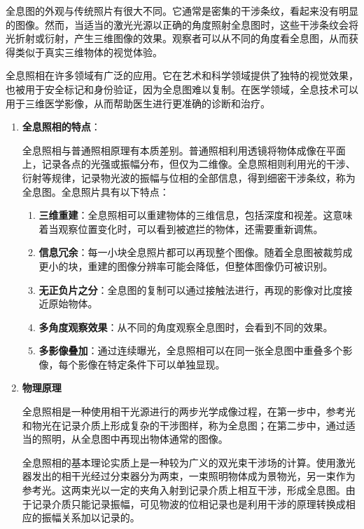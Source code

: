 \documentclass[dvipsnames, svgnames,a4paper,11pt]{article}
\begin{document}
	全息图的外观与传统照片有很大不同。它通常是密集的干涉条纹，看起来没有明显的图像。然而，当适当的激光光源以正确的角度照射全息图时，这些干涉条纹会将光折射或衍射，产生三维图像的效果。观察者可以从不同的角度看全息图，从而获得类似于真实三维物体的视觉体验。
	
	全息照相在许多领域有广泛的应用。它在艺术和科学领域提供了独特的视觉效果，也被用于安全标记和身份验证，因为全息图难以复制。在医学领域，全息技术可以用于三维医学影像，从而帮助医生进行更准确的诊断和治疗。
		
		\begin{enumerate}
			\item \textbf{全息照相的特点}：
			
				全息照相与普通照相原理有本质差别。普通照相利用透镜将物体成像在平面上，记录各点的光强或振幅分布，但仅为二维像。全息照相则利用光的干涉、衍射等规律，记录物光波的振幅与位相的全部信息，得到细密干涉条纹，称为全息图。全息照片具有以下特点：
				\begin{enumerate}
					\item \textbf{三维重建}：全息照相可以重建物体的三维信息，包括深度和视差。这意味着当观察位置变化时，可以看到被遮拦的物体，还需要重新调焦。
					\item \textbf{信息冗余}：每一小块全息照片都可以再现整个图像。随着全息图被裁剪成更小的块，重建的图像分辨率可能会降低，但整体图像仍可被识别。
					\item \textbf{无正负片之分}：全息图的复制可以通过接触法进行，再现的影像对比度接近原始物体。
					\item \textbf{多角度观察效果}：从不同的角度观察全息图时，会看到不同的效果。
					\item \textbf{多影像叠加}：通过连续曝光，全息照相可以在同一张全息图中重叠多个影像，每个影像在特定条件下可以单独显现。
				  \end{enumerate}
			\item \textbf{物理原理}
				
				全息照相是一种使用相干光源进行的两步光学成像过程，在第一步中，参考光和物光在记录介质上形成复杂的干涉图样，称为全息图；在第二步中，通过适当的照明，从全息图中再现出物体通常的图像。
				
				全息照相的基本理论实质上是一种较为广义的双光束干涉场的计算。使用激光器发出的相干光经过分束器分为两束，一束照明物体成为景物光，另一束作为参考光。这两束光以一定的夹角入射到记录介质上相互干涉，形成全息图。由于记录介质只能记录振幅，可见物波的位相记录也是利用干涉的原理转换成相应的振幅关系加以记录的。
				
				
				

\end{enumerate}
\end{document}
